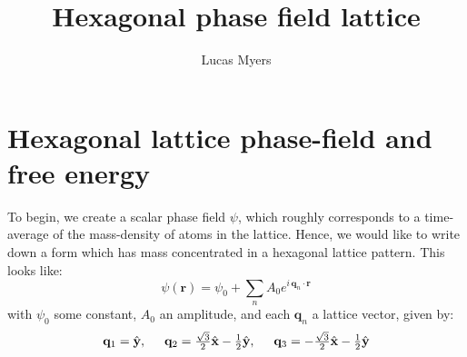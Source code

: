 \documentclass[reqno]{article}
\begin{document}
\title{Hexagonal phase field lattice}
\author{Lucas Myers}
\maketitle

\section{Hexagonal lattice phase-field and free energy}
To begin, we create a scalar phase field $\psi$, which roughly corresponds to a time-average of the mass-density of atoms in the lattice.
Hence, we would like to write down a form which has mass concentrated in a hexagonal lattice pattern.
This looks like:
\begin{equation}
    \psi(\mathbf{r})
    =
    \psi_0
    +
    \sum_n A_0 e^{i \, \mathbf{q}_n \cdot \mathbf{r}}
\end{equation}
with $\psi_0$ some constant, $A_0$ an amplitude, and each $\mathbf{q}_n$ a lattice vector, given by:
\begin{equation}
    \mathbf{q}_1 = \hat{\mathbf{y}}, \hspace{0.5cm}
    \mathbf{q}_2 = \tfrac{\sqrt{3}}{2} \hat{\mathbf{x}} - \tfrac12 \hat{\mathbf{y}}, \hspace{0.5cm}
    \mathbf{q}_3 = -\tfrac{\sqrt{3}}{2} \hat{\mathbf{x}} - \tfrac12 \hat{\mathbf{y}}
\end{equation}
\end{document}
